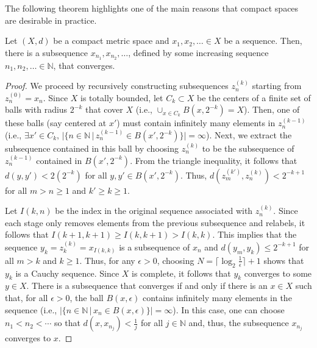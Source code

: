 The following theorem highlights one of the main reasons that compact spaces are desirable in practice.

\begin{theorem}
Let $(X,d)$ be a compact metric space and $x_1,x_2,\ldots \in X$ be a sequence.
Then, there is a subsequence $x_{n_1},x_{n_2},\ldots$, defined by some increasing sequence $n_1,n_2,\ldots \in \mathbb{N}$, that converges.
\end{theorem}
\begin{proof}
We proceed by recursively constructing subsequences $z^{(k)}_n$ starting from $z^{(0)}_n = x_n$.
Since $X$ is totally bounded, let $C_k \subset X$ be the centers of a finite set of balls with radius $2^{-k}$ that cover $X$ (i.e., $\cup_{x\in C_k} B(x,2^{-k}) = X$).
Then, one of these balls (say centered at $x'$) must contain infinitely many elements in $z^{(k-1)}_n$ (i.e., $\exists x' \in C_k, \,|\{n\in \mathbb{N}\,|\,z^{(k-1)}_n \in B(x',2^{-k})\}|=\infty$).
Next, we extract the subsequence contained in this ball by choosing $z^{(k)}_n$ to be the subsequence of $z^{(k-1)}_n$ contained in $B(x',2^{-k})$.
From the triangle inequality, it follows that $d(y,y')<2(2^{-k})$ for all $y,y'\in B(x',2^{-k})$.
Thus, $d(z^{(k')}_m,z^{(k)}_n) < 2^{-k+1}$ for all $m>n\geq 1$ and $k'\geq k \geq 1$.

Let $I(k,n)$ be the index in the original sequence associated with $z^{(k)}_n$.
Since each stage only removes elements from the previous subsequence and relabels, it follows that $I(k+1,k+1) \geq I(k,k+1) > I(k,k)$.
This implies that the sequence $y_k = z^{(k)}_k = x_{I(k,k)}$ is a subsequence of $x_n$ and
$d(y_m,y_k) \leq 2^{-k+1}$ for all $m>k$ and $k\geq1$.
Thus, for any $\epsilon >0$, choosing $N = \lceil \log_2 \frac{1}{\epsilon} \rceil + 1$ shows that $y_k$ is a Cauchy sequence.
Since $X$ is complete, it follows that $y_k$ converges to some $y\in X$.
\iffalse
There is a subsequence that converges  if and only if there is an $x\in X$ such that, for all $\epsilon>0$, the ball $B(x,\epsilon)$ contains infinitely many elements in the sequence (i.e., $|\{n\in \mathbb{N}\,|\,x_n \in B(x,\epsilon)\}|=\infty$).
In this case, one can choose $n_1 < n_2 < \cdots$ so that $d(x,x_{n_j}) \! < \! \frac{1}{j}$ for all $j\in \mathbb{N}$ and, thus, the subsequence $x_{n_j}$ converges to $x$.


\end{proof}
